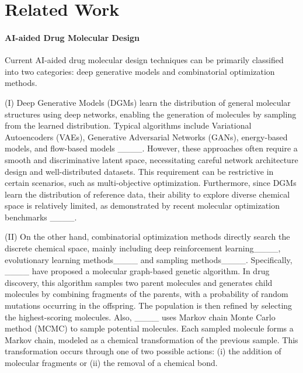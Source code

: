 \section{Related Work}
\paragraph{AI-aided Drug Molecular Design} 
Current AI-aided drug molecular design techniques can be primarily classified into two categories: deep generative models and combinatorial optimization methods. 

\noindent(I) Deep Generative Models (DGMs) learn the distribution of general molecular structures using deep networks, enabling the generation of molecules by sampling from the learned distribution. Typical algorithms include Variational Autoencoders (VAEs), Generative Adversarial Networks (GANs), energy-based models, and flow-based models ____. However, these approaches often require a smooth and discriminative latent space, necessitating careful network architecture design and well-distributed datasets. This requirement can be restrictive in certain scenarios, such as multi-objective optimization. Furthermore, since DGMs learn the distribution of reference data, their ability to explore diverse chemical space is relatively limited, as demonstrated by recent molecular optimization benchmarks ____. 

\noindent (II) On the other hand, combinatorial optimization methods directly search the discrete chemical space, mainly including deep reinforcement learning____, evolutionary learning methods____ and sampling methods____. Specifically, ____ have proposed a molecular graph-based genetic algorithm. In drug discovery, this algorithm samples two parent molecules and generates child molecules by combining fragments of the parents, with a probability of random mutations occurring in the offspring. The population is then refined by selecting the highest-scoring molecules.
Also, ____ uses Markov chain Monte Carlo method (MCMC) to sample potential molecules. Each sampled molecule forms a Markov chain, modeled as a chemical transformation of the previous sample. This transformation occurs through one of two possible actions: (i) the addition of molecular fragments or (ii) the removal of a chemical bond.

